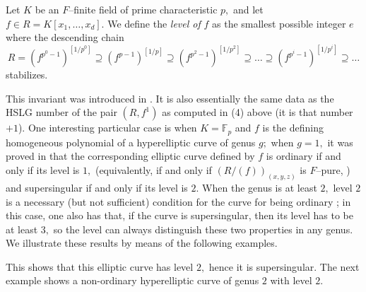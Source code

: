\documentclass{amsart}
\begin{document}
\begin{definition}
Let $K$ be an $F$--finite field of prime characteristic $p,$ and let
$f\in R=K[x_1,\ldots, x_d].$ We define the \emph{level of} $f$ as the
smallest possible integer $e$ where the descending chain
\[
R=(f^{p^0-1})^{[1/p^0]}\supseteq (f^{p-1})^{[1/p]}\supseteq
(f^{p^2-1})^{[1/p^2]}\supseteq\ldots%
\supseteq (f^{p^i-1})^{[1/p^i]}\supseteq\ldots
\]
stabilizes.
\end{definition}
This invariant was introduced in \cite{AlvarezBlickleLyubeznik2005}.  It is also essentially the same data as the HSLG number of the pair $(R, f^1)$ as computed in (4) above (it is that number $+1$).
One interesting particular
case is when $K=\mathbb{F}_p$ and $f$ is the defining homogeneous polynomial of a hyperelliptic curve
of genus $g;$ when $g=1,$ it was proved in
\cite{BoixDeStefaniVanzo2015} that the corresponding elliptic curve defined by $f$
is ordinary if and only if its level is $1,$ (equivalently, if and only if
$(R/(f))_{(x,y,z)}$ is $F$--pure, %
) and supersingular if and only if its level is $2.$ When
the genus is at least $2,$ level $2$ is a necessary (but not sufficient) condition for the curve
for being ordinary \cite{BlancoBoixFordhamYilmaz2018}; in this case, one also
has that, if the curve is supersingular, then its level has to be at least $3,$ so the level can
always distinguish these two properties in any genus. We illustrate these results by means
of the following examples.

\medskip
{\small
{}
}\medskip

This shows that this elliptic curve has level $2,$ hence it is supersingular. The next example
shows a non-ordinary hyperelliptic curve of genus $2$ with level $2$.
\end{document}
